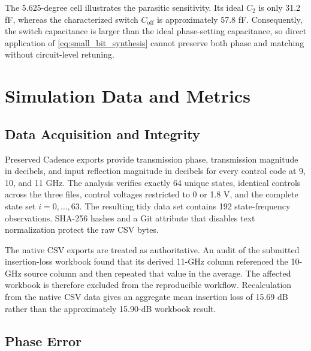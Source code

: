 \documentclass[conference]{IEEEtran}
\begin{document}
The 5.625-degree cell illustrates the parasitic sensitivity. Its ideal
$C_2$ is only 31.2 fF, whereas the characterized switch
$C_{\mathrm{off}}$ is approximately 57.8 fF. Consequently, the switch
capacitance is larger than the ideal phase-setting capacitance, so direct
application of \eqref{eq:small_bit_synthesis} cannot preserve both phase and
matching without circuit-level retuning.

\section{Simulation Data and Metrics}

\subsection{Data Acquisition and Integrity}

Preserved Cadence exports provide transmission phase, transmission magnitude in
decibels, and input reflection magnitude in decibels for every control code
at 9, 10, and 11 GHz. The analysis verifies exactly 64 unique states,
identical controls across the three files, control voltages restricted to
0 or 1.8 V, and the complete state set $i=0,\ldots,63$. The resulting tidy
data set contains 192 state-frequency observations. SHA-256 hashes and a Git
attribute that disables text normalization protect the raw CSV bytes.

The native CSV exports are treated as authoritative. An audit of the
submitted insertion-loss workbook found that its derived 11-GHz column
referenced the 10-GHz source column and then repeated that value in the
average. The affected workbook is therefore excluded from the reproducible
workflow. Recalculation from the native CSV data gives an aggregate mean
insertion loss of 15.69 dB rather than the approximately 15.90-dB workbook
result.

\subsection{Phase Error}
\end{document}
